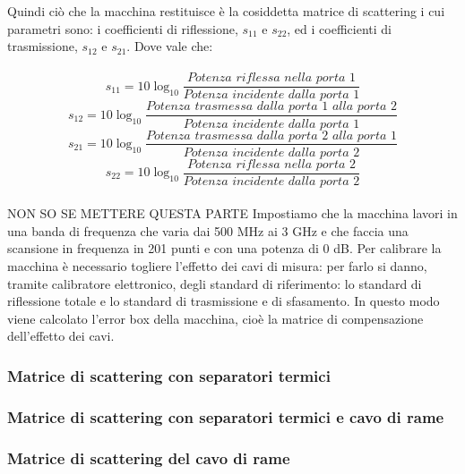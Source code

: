 Quindi ciò che la macchina restituisce è la cosiddetta matrice di scattering i cui parametri sono: i coefficienti di riflessione, \textit{$s_{11}$} e \textit{$s_{22}$}, ed i coefficienti di trasmissione, \textit{$s_{12}$} e \textit{$s_{21}$}. Dove vale che:\\\\
\begin{equation}
    s_{11}=10\log_{10} \frac{Potenza\,\,riflessa\,\,nella\,\,porta\,\,1}{Potenza\,\,incidente\,\,dalla\,\,porta\,\,1}
\end{equation}
\begin{equation}
    s_{12}=10\log_{10} \frac{Potenza\,\,trasmessa\,\,dalla\,\,porta\,\,1\,\,alla\,\,porta\,\,2}{Potenza\,\,incidente\,\,dalla\,\,porta\,\,1}
\end{equation}
\begin{equation}
    s_{21}=10\log_{10} \frac{Potenza\,\,trasmessa\,\,dalla\,\,porta\,\,2\,\,alla\,\,porta\,\,1}{Potenza\,\,incidente\,\,dalla\,\,porta\,\,2}
\end{equation}
\begin{equation}
    s_{22}=10\log_{10} \frac{Potenza\,\,riflessa\,\,nella\,\,porta\,\,2}{Potenza\,\,incidente\,\,dalla\,\,porta\,\,2}
\end{equation}
\\NON SO SE METTERE QUESTA PARTE
Impostiamo che la macchina lavori in una banda di frequenza che varia dai 500 MHz ai 3 GHz e che faccia una scansione in frequenza in 201 punti e con una potenza di 0 dB. Per calibrare la macchina è necessario togliere l’effetto dei cavi di misura: per farlo si danno, tramite calibratore elettronico, degli standard di riferimento: lo standard di riflessione totale e lo standard di trasmissione e di sfasamento. In questo modo viene calcolato l’error box della macchina, cioè la matrice di compensazione dell’effetto dei cavi.


\subsubsection{Matrice di scattering con separatori termici}
\subsubsection{Matrice di scattering con separatori termici e cavo di rame}
\subsubsection{Matrice di scattering del cavo di rame}
